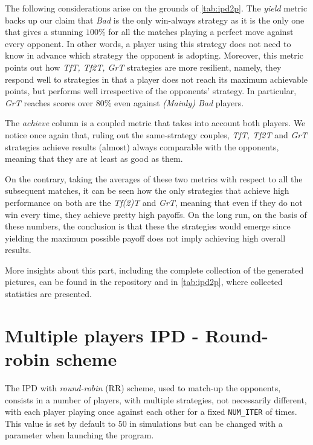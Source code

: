 \documentclass[journal,10pt,twoside]{IEEEtran}
\begin{document}
The following considerations arise on the grounds of \autoref{tab:ipd2p}.
The \textit{yield} metric backs up our claim that \textit{Bad} is the only win-always strategy as it is the only one that gives a stunning $100\%$ for all the matches playing a perfect move against every opponent. In other words, a player using this strategy does not need to know in advance which strategy the opponent is adopting. Moreover, this metric points out how \textit{TfT, Tf2T, GrT} strategies are more resilient, namely, they respond well to strategies in that a player does not reach its maximum achievable points, but performs well irrespective of the opponents' strategy. In particular, \textit{GrT} reaches scores over $80\%$ even against \textit{(Mainly) Bad} players.

The \textit{achieve} column is a coupled metric that takes into account both players. We notice once again that, ruling out the same-strategy couples, \textit{TfT, Tf2T} and \textit{GrT} strategies achieve results (almost) always comparable with the opponents, meaning that they are at least as good as them.

On the contrary, taking the averages of these two metrics with respect to all the subsequent matches, it can be seen how the only strategies that achieve high performance on both are the \textit{Tf(2)T} and \textit{GrT}, meaning that even if they do not win every time, they achieve pretty high payoffs. %
On the long run, on the basis of these numbers, the conclusion is that these the strategies would emerge since yielding the maximum possible payoff does not imply achieving high overall results.

More insights about this part, including the complete collection of the generated pictures, can be found in the repository and in \autoref{tab:ipd2p}, where collected statistics are presented.

\section{Multiple players IPD - Round-robin scheme} \label{s:IPDMP}
The IPD with \textit{round-robin} (RR) scheme, used to match-up the opponents, consists in a number of players, with multiple strategies, not necessarily different, with each player playing once against each other for a fixed \texttt{NUM\_ITER} of times. This value is set by default to $50$ in simulations but can be changed with a parameter when launching the program.
\end{document}
